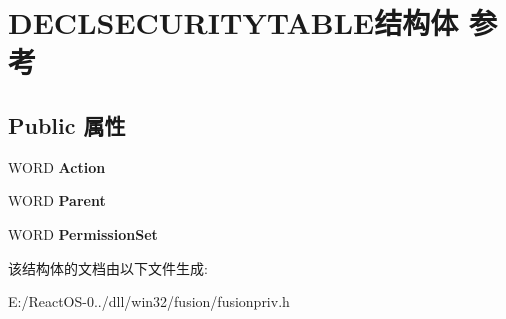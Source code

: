 \hypertarget{struct_d_e_c_l_s_e_c_u_r_i_t_y_t_a_b_l_e}{}\section{D\+E\+C\+L\+S\+E\+C\+U\+R\+I\+T\+Y\+T\+A\+B\+L\+E结构体 参考}
\label{struct_d_e_c_l_s_e_c_u_r_i_t_y_t_a_b_l_e}
\subsection*{Public 属性}
\begin{DoxyCompactItemize}
\item 
\mbox{\label{struct_d_e_c_l_s_e_c_u_r_i_t_y_t_a_b_l_e_ab524208da22307e58166244b8356caa4}} 
W\+O\+RD {\bfseries Action}
\item 
\mbox{\label{struct_d_e_c_l_s_e_c_u_r_i_t_y_t_a_b_l_e_aa91612f98d79830b2bffcfdc631e8bd1}} 
W\+O\+RD {\bfseries Parent}
\item 
\mbox{\label{struct_d_e_c_l_s_e_c_u_r_i_t_y_t_a_b_l_e_adac44761b8a71f0890520ddc6b9a482f}} 
W\+O\+RD {\bfseries Permission\+Set}
\end{DoxyCompactItemize}


该结构体的文档由以下文件生成\+:\begin{DoxyCompactItemize}
\item 
E\+:/\+React\+O\+S-\/0../dll/win32/fusion/fusionpriv.\+h\end{DoxyCompactItemize}
